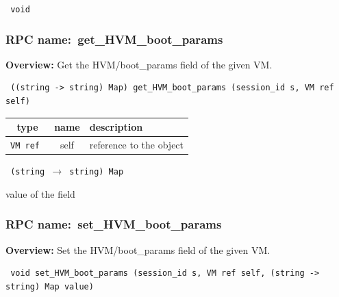 \vspace{0.3cm}

{\tt 
void
}



\vspace{0.3cm}
\vspace{0.3cm}
\vspace{0.3cm}
\subsubsection{RPC name:~get\_HVM\_boot\_params}

{\bf Overview:} 
Get the HVM/boot\_params field of the given VM.

\begin{verbatim} ((string -> string) Map) get_HVM_boot_params (session_id s, VM ref self)\end{verbatim}



 
\vspace{0.3cm}
\begin{tabular}{|c|c|p{7cm}|}
 \hline
{\bf type} & {\bf name} & {\bf description} \\ \hline
{\tt VM ref } & self & reference to the object \\ \hline 

\end{tabular}

\vspace{0.3cm}

{\tt 
(string $\rightarrow$ string) Map
}


value of the field
\vspace{0.3cm}
\vspace{0.3cm}
\vspace{0.3cm}
\subsubsection{RPC name:~set\_HVM\_boot\_params}

{\bf Overview:} 
Set the HVM/boot\_params field of the given VM.

\begin{verbatim} void set_HVM_boot_params (session_id s, VM ref self, (string -> string) Map value)\end{verbatim}



